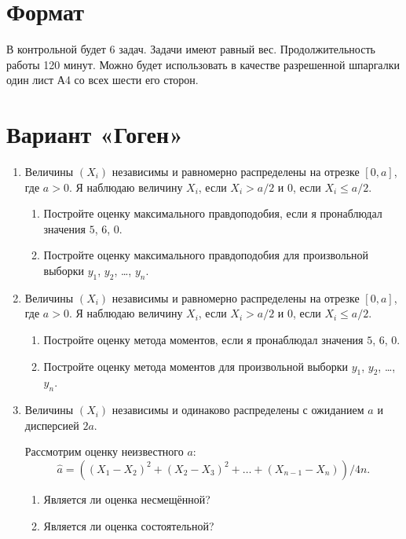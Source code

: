 \documentclass[12pt]{article}
\begin{document}
\section*{Формат}

В контрольной будет 6 задач.
Задачи имеют равный вес. 
Продолжительность работы 120 минут. 
Можно будет использовать в качестве разрешенной шпаргалки один лист А4 со всех шести его сторон.



\section*{Вариант «Гоген»}
\begin{enumerate}
    \item Величины $(X_i)$ независимы и равномерно распределены на отрезке $[0, a]$, где $a > 0$.
    Я наблюдаю величину $X_i$, если $X_i > a/2$ и $0$, если $X_i \leq a/2$.
    \begin{enumerate}
        \item Постройте оценку максимального правдоподобия, если я пронаблюдал значения $5$, $6$, $0$.
        \item Постройте оценку максимального правдоподобия для произвольной выборки $y_1$, $y_2$, \dots, $y_n$.
    \end{enumerate}
    
    \item Величины $(X_i)$ независимы и равномерно распределены на отрезке $[0, a]$, где $a > 0$.
    Я наблюдаю величину $X_i$, если $X_i > a/2$ и $0$, если $X_i \leq a/2$.
    \begin{enumerate}
        \item Постройте оценку метода моментов, если я пронаблюдал значения $5$, $6$, $0$.
        \item Постройте оценку метода моментов для произвольной выборки $y_1$, $y_2$, \dots, $y_n$.
    \end{enumerate}

    \item Величины $(X_i)$ независимы и одинаково распределены с ожиданием $a$ и дисперсией $2a$.
    
    Рассмотрим оценку неизвестного $a$:
    \[
 \hat a = ((X_1 - X_2)^2 + (X_2 - X_3)^2 + \dots + (X_{n-1} - X_{n})) / 4n.
    \]

    \begin{enumerate}
        \item Является ли оценка несмещённой?
        \item Является ли оценка состоятельной?
    \end{enumerate}


\end{enumerate}
\end{document}
